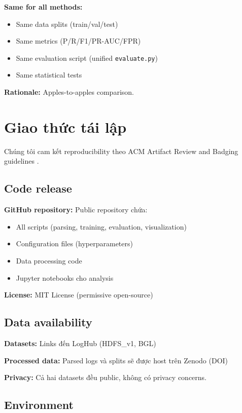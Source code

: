 \textbf{Same for all methods:}
\begin{itemize}
    \item Same data splits (train/val/test)
    \item Same metrics (P/R/F1/PR-AUC/FPR)
    \item Same evaluation script (unified \texttt{evaluate.py})
    \item Same statistical tests
\end{itemize}

\textbf{Rationale:} Apples-to-apples comparison.

\section{Giao thức tái lập}
\label{sec:reproducibility}

Chúng tôi cam kết reproducibility theo ACM Artifact Review and Badging guidelines \cite{acm_artifact_badging}.

\subsection{Code release}

\textbf{GitHub repository:} Public repository chứa:
\begin{itemize}
    \item All scripts (parsing, training, evaluation, visualization)
    \item Configuration files (hyperparameters)
    \item Data processing code
    \item Jupyter notebooks cho analysis
\end{itemize}

\textbf{License:} MIT License (permissive open-source)

\subsection{Data availability}

\textbf{Datasets:} Links đến LogHub (HDFS\_v1, BGL)

\textbf{Processed data:} Parsed logs và splits sẽ được host trên Zenodo (DOI)

\textbf{Privacy:} Cả hai datasets đều public, không có privacy concerns.

\subsection{Environment}

